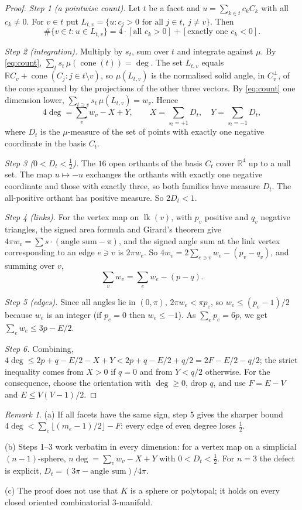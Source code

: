 \documentclass[11pt]{article}
\theoremstyle{remark}
\newtheorem{remark}[theorem]{Remark}
\newcommand{\R}{\mathbb{R}}
\newcommand{\cone}{\operatorname{cone}}
\newcommand{\lk}{\operatorname{lk}}
\begin{document}
\begin{proof}
\emph{Step 1 (a pointwise count).} Let $t$ be a facet and $u=\sum_{k\in t}c_kC_k$ with all $c_k\ne0$. For $v\in t$ put $L_{t,v}=\{u: c_j>0\text{ for all }j\in t,\ j\ne v\}$. Then
\[
\#\{v\in t:u\in L_{t,v}\}=4\cdot[\text{all }c_k>0]+[\text{exactly one }c_k<0].
\]

\emph{Step 2 (integration).} Multiply by $s_t$, sum over $t$ and integrate against $\mu$. By \eqref{eq:count}, $\sum_ts_t\,\mu(\cone(t))=\deg$. The set $L_{t,v}$ equals $\R C_v+\cone(C_j:j\in t\setminus v)$, so $\mu(L_{t,v})$ is the normalised solid angle, in $C_v^\perp$, of the cone spanned by the projections of the other three vectors. By \eqref{eq:count} one dimension lower, $\sum_{t\ni v}s_t\,\mu(L_{t,v})=w_v$. Hence
\begin{equation}\label{eq:identity}
4\deg=\sum_vw_v-X+Y,\qquad X=\sum_{s_t=+1}D_t,\quad Y=\sum_{s_t=-1}D_t,
\end{equation}
where $D_t$ is the $\mu$-measure of the set of points with exactly one negative coordinate in the basis $C_t$.

\emph{Step 3 ($0<D_t<\tfrac12$).} The $16$ open orthants of the basis $C_t$ cover $\R^4$ up to a null set. The map $u\mapsto-u$ exchanges the orthants with exactly one negative coordinate and those with exactly three, so both families have measure $D_t$. The all-positive orthant has positive measure. So $2D_t<1$.

\emph{Step 4 (links).} For the vertex map on $\lk(v)$, with $p_v$ positive and $q_v$ negative triangles, the signed area formula and Girard's theorem give $4\pi w_v=\sum s\cdot(\text{angle sum}-\pi)$, and the signed angle sum at the link vertex corresponding to an edge $e\ni v$ is $2\pi w_e$. So $4w_v=2\sum_{e\ni v}w_e-(p_v-q_v)$, and summing over $v$,
\[
\sum_vw_v=\sum_ew_e-(p-q).
\]

\emph{Step 5 (edges).} Since all angles lie in $(0,\pi)$, $2\pi w_e<\pi p_e$, so $w_e\le(p_e-1)/2$ because $w_e$ is an integer (if $p_e=0$ then $w_e\le-1$). As $\sum_ep_e=6p$, we get $\sum_ew_e\le3p-E/2$.

\emph{Step 6.} Combining, $4\deg\le2p+q-E/2-X+Y<2p+q-E/2+q/2=2F-E/2-q/2$; the strict inequality comes from $X>0$ if $q=0$ and from $Y<q/2$ otherwise. For the consequence, choose the orientation with $\deg\ge0$, drop $q$, and use $F=E-V$ and $E\le V(V-1)/2$.
\end{proof}

\begin{remark}\label{rem:refine}
(a) If all facets have the same sign, step 5 gives the sharper bound $4\deg<\sum_e\lfloor(m_e-1)/2\rfloor-F$: every edge of even degree loses $\tfrac12$.

(b) Steps 1--3 work verbatim in every dimension: for a vertex map on a simplicial $(n-1)$-sphere, $n\deg=\sum_vw_v-X+Y$ with $0<D_t<\tfrac12$. For $n=3$ the defect is explicit, $D_t=(3\pi-\text{angle sum})/4\pi$.

(c) The proof does not use that $K$ is a sphere or polytopal; it holds on every closed oriented combinatorial $3$-manifold.
\end{remark}
\end{document}
